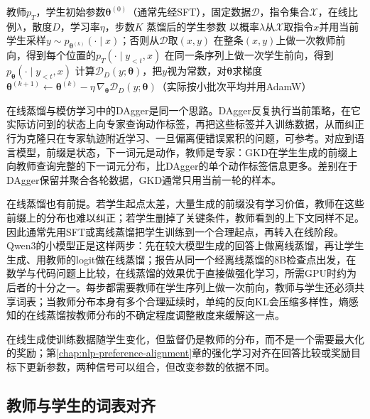\begin{algorithm}[GKD在线蒸馏]
  \label{alg:nlp-sft-gkd}
  \begin{algorithmic}[1]
    \Require 教师$p_T$，学生初始参数$\bm\theta^{(0)}$（通常先经SFT），固定数据$\mathcal D$，指令集合$\mathcal X$，在线比例$\lambda$，散度$D$，学习率$\eta$，步数$K$
    \Ensure 蒸馏后的学生参数
      \State 以概率$\lambda$从$\mathcal X$取指令$x$并用当前学生采样$y\sim p_{\bm\theta^{(k)}}(\cdot\mid x)$；否则从$\mathcal D$取$(x,y)$
      \State 在整条$(x,y)$上做一次教师前向，得到每个位置的$p_T(\cdot\mid y_{<t},x)$
      \State 在同一条序列上做一次学生前向，得到$p_{\bm\theta}(\cdot\mid y_{<t},x)$
      \State 计算$\mathcal D_D(y;\bm\theta)$，把$y$视为常数，对$\bm\theta$求梯度
      \State $\bm\theta^{(k+1)}\gets\bm\theta^{(k)}-\eta\,\nabla_{\bm\theta}\mathcal D_D(y;\bm\theta)$（实际按小批次平均并用AdamW）
    \EndFor
  \end{algorithmic}
\end{algorithm}

在线蒸馏与模仿学习中的DAgger是同一个思路。DAgger反复执行当前策略，在它实际访问到的状态上向专家查询动作标签，再把这些标签并入训练数据，从而纠正行为克隆只在专家轨迹附近学习、一旦偏离便错误累积的问题，可参考。对应到语言模型，前缀是状态，下一词元是动作，教师是专家：GKD在学生生成的前缀上向教师查询完整的下一词元分布，比DAgger的单个动作标签信息更多。差别在于DAgger保留并聚合各轮数据，GKD通常只用当前一轮的样本。

在线蒸馏也有前提。若学生起点太差，大量生成的前缀没有学习价值，教师在这些前缀上的分布也难以纠正；若学生删掉了关键条件，教师看到的上下文同样不足。因此通常先用SFT或离线蒸馏把学生训练到一个合理起点，再转入在线阶段。Qwen3的小模型正是这样两步：先在较大模型生成的回答上做离线蒸馏，再让学生生成、用教师的logit做在线蒸馏；报告从同一个经离线蒸馏的8B检查点出发，在数学与代码问题上比较，在线蒸馏的效果优于直接做强化学习，所需GPU时约为后者的十分之一。每步都需要教师在学生序列上做一次前向，教师与学生还必须共享词表；当教师分布本身有多个合理延续时，单纯的反向KL会压缩多样性，熵感知的在线蒸馏按教师分布的不确定程度调整散度来缓解这一点。

在线生成使训练数据随学生变化，但监督仍是教师的分布，而不是一个需要最大化的奖励；第\ref{chap:nlp-preference-alignment}章的强化学习对齐在回答比较或奖励目标下更新参数，两种信号可以组合，但改变参数的依据不同。

\subsection{教师与学生的词表对齐}
\label{sec:nlp-sft-vocab-alignment}

